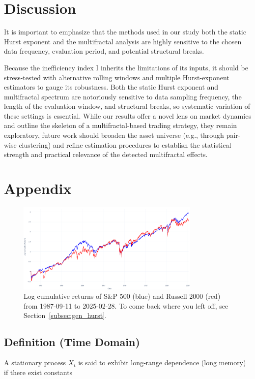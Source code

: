\documentclass[11pt]{extarticle}
\begin{document}
\section{Discussion}

It is important to emphasize that the methods used in our study both the static Hurst exponent and the multifractal
analysis are highly sensitive to the chosen data frequency, evaluation period, and potential structural breaks.

Because the inefficiency index I inherits the limitations of its inputs, it should be stress-tested with alternative
rolling windows and multiple Hurst-exponent estimators to gauge its robustness. Both the static Hurst exponent and
multifractal spectrum are notoriously sensitive to data sampling frequency, the length of the evaluation window, and
structural breaks, so systematic variation of these settings is essential. While our results offer a novel lens on market
dynamics and outline the skeleton of a multifractal-based trading strategy, they remain exploratory, future work should
broaden the asset universe (e.g., through pair-wise clustering) and refine estimation procedures to establish the statistical
strength and practical relevance of the detected multifractal effects.

\section{Appendix}

\begin{figure}[ht]
    \centering
    \includegraphics[width=0.8\textwidth]{img/log_cumulative_returns.png}
    \caption{Log cumulative returns of S\&P 500 (blue) and Russell 2000 (red) from 1987-09-11 to 2025-02-28.
    To come back where you left off, see Section~\ref{subsec:gen_hurst}.}
    \label{fig:cumulative_returns}
\end{figure}

\FloatBarrier

\subsection{Definition (Time Domain)}
\label{sec:long_range_dependence}
A stationary process \(X_t\) is said to exhibit long‐range dependence (long memory) if there exist constants
\end{document}
